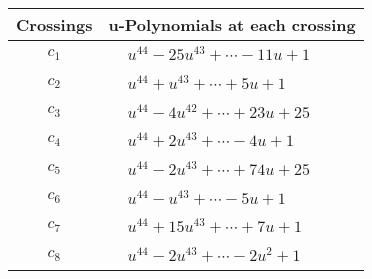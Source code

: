 \documentclass[1p]{elsarticle_modified}
\theoremstyle{definition}
\begin{document}
\begin{tabular}{m{50pt}|m{274pt}}
Crossings & \hspace{64pt}u-Polynomials at each crossing \\
\hline $$\begin{aligned}c_{1}\end{aligned}$$&$\begin{aligned}
&u^{44}-25 u^{43}+\cdots-11 u+1
\end{aligned}$\\
\hline $$\begin{aligned}c_{2}\end{aligned}$$&$\begin{aligned}
&u^{44}+u^{43}+\cdots+5 u+1
\end{aligned}$\\
\hline $$\begin{aligned}c_{3}\end{aligned}$$&$\begin{aligned}
&u^{44}-4 u^{42}+\cdots+23 u+25
\end{aligned}$\\
\hline $$\begin{aligned}c_{4}\end{aligned}$$&$\begin{aligned}
&u^{44}+2 u^{43}+\cdots-4 u+1
\end{aligned}$\\
\hline $$\begin{aligned}c_{5}\end{aligned}$$&$\begin{aligned}
&u^{44}-2 u^{43}+\cdots+74 u+25
\end{aligned}$\\
\hline $$\begin{aligned}c_{6}\end{aligned}$$&$\begin{aligned}
&u^{44}- u^{43}+\cdots-5 u+1
\end{aligned}$\\
\hline $$\begin{aligned}c_{7}\end{aligned}$$&$\begin{aligned}
&u^{44}+15 u^{43}+\cdots+7 u+1
\end{aligned}$\\
\hline $$\begin{aligned}c_{8}\end{aligned}$$&$\begin{aligned}
&u^{44}-2 u^{43}+\cdots-2 u^2+1
\end{aligned}$\\

\end{tabular}
\end{document}
